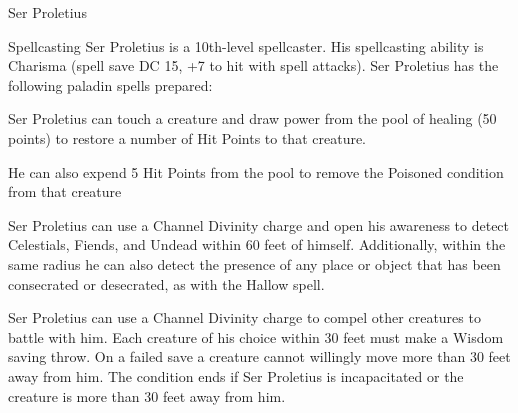 \begin{DndMonster}[width=\textwidth + 8pt]{Ser Proletius}
\begin{multicols}{2}
		\DndMonsterAttack[
			name			= Javelin,
			distance		= ranged, %
			mod				= +9,
			range			= 30/120,
			targets			= one target,
			dmg				= \DndDice{1d6 + 5},
			dmg-type		= Piercing,
			extra			= {. A creature hit with this attack has its speed reduced by 10 feet, up to a maximum reduction of 10 feet},
		]
		
		\begin{DndMonsterSpells}
			\item[Spellcasting] Ser Proletius is a 10th-level spellcaster. His spellcasting ability is Charisma (spell save DC 15, +7 to hit with spell attacks). Ser Proletius has the following paladin spells prepared:
		\end{DndMonsterSpells}
		
		Ser Proletius can touch a creature and draw power from the pool of healing (50 points) to restore a number of Hit Points to that creature.
		
		He can also expend 5 Hit Points from the pool to remove the Poisoned condition from that creature
		
		Ser Proletius can use a Channel Divinity charge and open his awareness to detect Celestials, Fiends, and Undead within 60 feet of himself. Additionally, within the same radius he can also detect the presence of any place or object that has been consecrated or desecrated, as with the Hallow spell.
		
		Ser Proletius can use a Channel Divinity charge to compel other creatures to battle with him. Each creature of his choice within 30 feet must make a Wisdom saving throw. On a failed save a creature cannot willingly move more than 30 feet away from him. The condition ends if Ser Proletius is incapacitated or the creature is more than 30 feet away from him.
		

\end{multicols}
\end{DndMonster}
